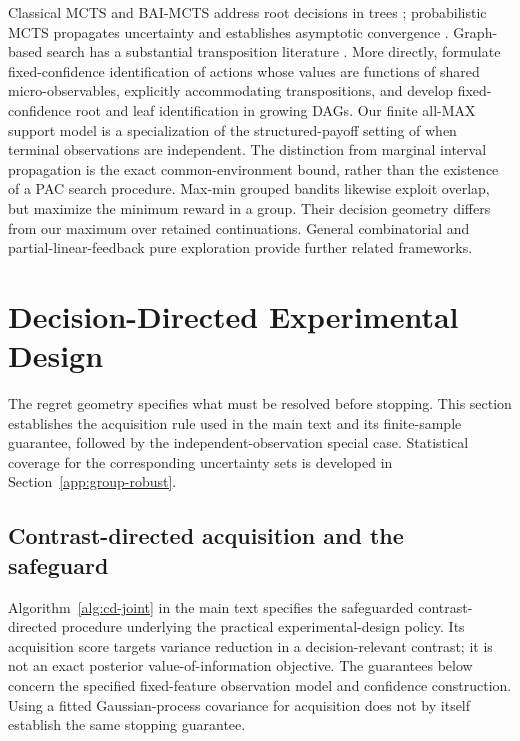 \documentclass{article}
\theoremstyle{plain}
\theoremstyle{definition}
\begin{document}
Classical MCTS and BAI-MCTS address root decisions in trees \citep{uctoriginal,kaufmann}; probabilistic MCTS propagates uncertainty and establishes asymptotic convergence \citep{tesauro2010bayesian,dam2025wasserstein}. Graph-based search has a substantial transposition literature \citep{childs2008transpositions,saffidine2012ucd,czech2021mcgs,kujanpaa2024cmcgs}. More directly, \citet{huang} formulate fixed-confidence identification of actions whose values are functions of shared micro-observables, explicitly accommodating transpositions, and \citet{pelissier} develop fixed-confidence root and leaf identification in growing DAGs. Our finite all-MAX support model is a specialization of the structured-payoff setting of \citet{huang} when terminal observations are independent. The distinction from marginal interval propagation is the exact common-environment bound, rather than the existence of a PAC search procedure. Max-min grouped bandits \citep{wang2022grouped} likewise exploit overlap, but maximize the minimum reward in a group. Their decision geometry differs from our maximum over retained continuations. General combinatorial and partial-linear-feedback pure exploration \citep{chen2014combinatorial,du2021partial} provide further related frameworks.

\clearpage

\section{Decision-Directed Experimental Design}
\label{app:group-acquisition}

The regret geometry specifies what must be resolved before stopping. This section establishes the acquisition rule used in the main text and its finite-sample guarantee, followed by the independent-observation special case. Statistical coverage for the corresponding uncertainty sets is developed in Section~\ref{app:group-robust}.

\subsection{Contrast-directed acquisition and the safeguard}
\label{app:bay-additional}

Algorithm~\ref{alg:cd-joint} in the main text specifies the safeguarded contrast-directed procedure underlying the practical experimental-design policy. Its acquisition score targets variance reduction in a decision-relevant contrast; it is not an exact posterior value-of-information objective. The guarantees below concern the specified fixed-feature observation model and confidence construction. Using a fitted Gaussian-process covariance for acquisition does not by itself establish the same stopping guarantee.
\end{document}

